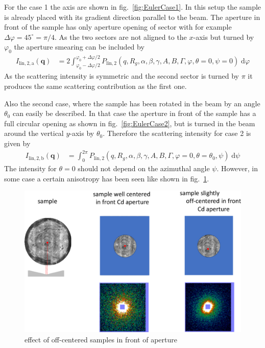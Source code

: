 For the case 1 the axis are shown in fig.\ \ref{fig:EulerCase1}. In this setup the sample is already placed with its gradient direction parallel to the beam. The aperture in front of the sample has only aperture opening of sector with for example $\Delta\varphi=45^\circ=\pi/4$. As the two sectors are not aligned to the $x$-axis but turned by $\varphi_0$ the aperture smearing can be included by
\begin{align}\label{eq:case1}
  I_{\mathrm{lin},2,\mathrm{a}}(\mathbf{q}) & = 2\int_{\varphi_0-\Delta\varphi/2}^{\varphi_0+\Delta\varphi/2} P_\mathrm{lin,2}(q,R_g,\alpha,\beta,\gamma,A,B,\mathit{\Gamma},\varphi,\theta=0,\psi=0) \;\mathrm{d}\varphi
\end{align}
As the scattering intensity is symmetric and the second sector is turned by $\pi$ it produces the same scattering contribution as the first one.

Also the second case, where the sample has been rotated in the beam by an angle $\theta_0$ can easily be described. In that case the aperture in front of the sample has a full circular opening as shown in fig.\ \ref{fig:EulerCase2}, but is turned in the beam around the vertical $y$-axis by $\theta_0$. Therefore the scattering intensity for case 2 is given by
\begin{align}\label{eq:case1}
  I_{\mathrm{lin},2,\mathrm{b}}(\mathbf{q}) & = \int_{0}^{2\pi} P_\mathrm{lin,2}(q,R_g,\alpha,\beta,\gamma,A,B,\mathit{\Gamma},\varphi=0,\theta=\theta_0,\psi) \;\mathrm{d}\psi
\end{align}
The intensity for $\theta=0$ should not depend on the azimuthal angle $\psi$. However, in some case a certain anisotropy has been seen like shown in fig.\  \ref{fig:offcentered}.
\begin{figure}[htb]
  \centering
  \includegraphics[width=.66\textwidth]{../images/form_factor/deformed_sheared/offcentered.pdf}
  \caption{effect of off-centered samples in front of aperture}
  \label{fig:offcentered}
\end{figure}

